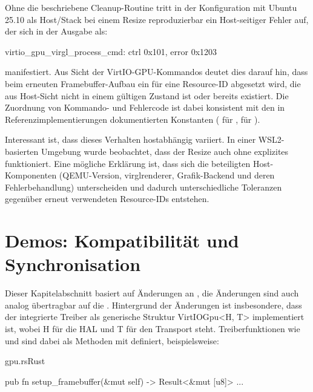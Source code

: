 Ohne die beschriebene Cleanup-Routine tritt in der Konfiguration mit Ubuntu 25.10 als Host/Stack bei einem Resize reproduzierbar ein Host-seitiger Fehler auf, der sich in der Ausgabe als:

\begin{terminalblock}
  \begin{textcode}
virtio_gpu_virgl_process_cmd: ctrl 0x101, error 0x1203
  \end{textcode}
\end{terminalblock}

manifestiert. Aus Sicht der VirtIO-GPU-Kommandos deutet dies darauf hin, dass beim erneuten Framebuffer-Aufbau ein  für eine Resource-ID abgesetzt wird, die aus Host-Sicht nicht in einem gültigen Zustand ist oder bereits existiert. Die Zuordnung von Kommando- und Fehlercode ist dabei konsistent mit den in Referenzimplementierungen dokumentierten Konstanten ( für ,  für ).

Interessant ist, dass dieses Verhalten hostabhängig variiert. In einer WSL2-basierten Umgebung wurde beobachtet, dass der Resize auch ohne explizites  funktioniert. Eine mögliche Erklärung ist, dass sich die beteiligten Host-Komponenten (QEMU-Version, virglrenderer, Grafik-Backend und deren Fehlerbehandlung) unterscheiden und dadurch unterschiedliche Toleranzen gegenüber erneut verwendeten Resource-IDs entstehen.

\section{Demos: Kompatibilität und Synchronisation}

Dieser Kapitelabschnitt basiert auf Änderungen an , die Änderungen sind auch analog übertragbar auf die . Hintergrund der Änderungen ist insbesondere, dass der integrierte Treiber als generische Struktur VirtIOGpu<H, T> implementiert ist, wobei H für die HAL und T für den Transport steht. Treiberfunktionen wie  und  sind dabei als Methoden mit  definiert, beispielsweise:

\begin{codeblock}{gpu.rs}{Rust}
  \begin{rustcode}
pub fn setup_framebuffer(&mut self) -> Result<&mut [u8]> { ... }
  \end{rustcode}
\end{codeblock}

